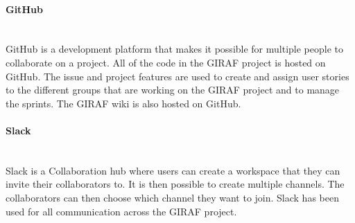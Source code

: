 \paragraph{GitHub}~\\
GitHub is a development platform that makes it possible for multiple people to collaborate on a project. 
All of the code in the GIRAF project is hosted on GitHub.
The issue and project features are used to create and assign user stories to the different groups that are working on the GIRAF project and to manage the sprints. 
The GIRAF wiki is also hosted on GitHub.

\paragraph{Slack}~\\
Slack is a Collaboration hub where users can create a workspace that they can invite their collaborators to.
It is then possible to create multiple channels. The collaborators can then choose which channel they want to join.
Slack has been used for all communication across the GIRAF project.


